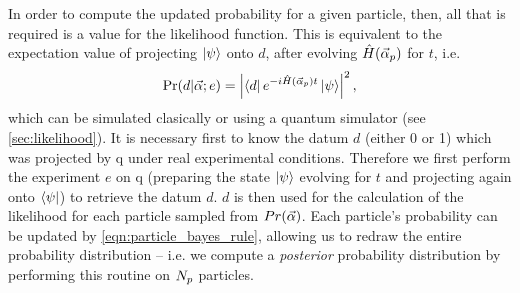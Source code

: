 In order to compute the updated probability for a given particle, then, all that is required is a value for the likelihood function.
This is equivalent to the expectation value of projecting $\ket{\psi}$ onto $d$, after evolving $\hat{H}(\vec{\alpha}_p)$ for $t$, i.e. 
\begin{equation}
    \label{eqn:likelihood}
    \Pr(d | \vec{\alpha}; e) = \left| \bra{d} e^{-i \hat{H}(\vec{\alpha}_p)t} \ket{\psi} \right|^2,   
\end{equation}
    which can be simulated clasically or using a quantum simulator (see \cref{sec:likelihood}). 
It is necessary first to know the datum $d$ (either 0 or 1) which was projected by \gls{q} under real experimental conditions. 
Therefore we first perform the experiment $e$ on \gls{q} 
    (preparing the state $\ket{\psi}$ evolving for $t$ and projecting again onto $\bra{\psi}$)
    to retrieve the datum $d$. 
$d$ is then used for the calculation of the likelihood for each particle sampled from $Pr({\vec{\alpha}})$. 
Each particle's probability can be updated by \cref{eqn:particle_bayes_rule}, 
    allowing us to redraw the entire probability distribution -- i.e. we compute a \emph{posterior} probability distribution
    by performing this routine on $N_p$ particles. 


